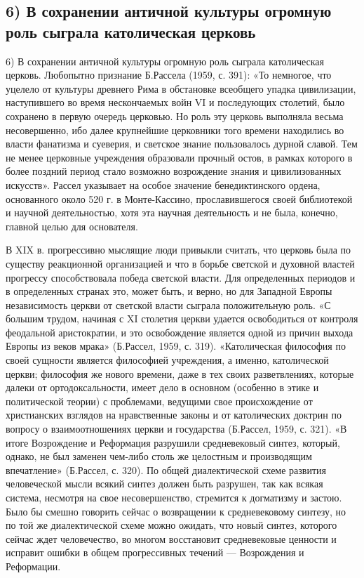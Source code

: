 \subsection{6) В сохранении античной культуры огромную роль сыграла
католическая церковь}

6) В сохранении античной культуры огромную роль сыграла
католическая церковь. Любопытно признание Б.Рассела (1959, с. 391):
«То немногое, что уцелело от культуры древнего Рима в обстановке
всеобщего упадка цивилизации, наступившего во время нескончаемых войн
VI и последующих столетий, было сохранено в первую очередь церковью.
Но роль эту церковь выполняла весьма несовершенно, ибо далее
крупнейшие церковники того времени находились во власти фанатизма и
суеверия, и светское знание пользовалось дурной славой. Тем не менее
церковные учреждения образовали прочный остов, в рамках которого в
более поздний период стало возможно возрождение знания и
цивилизованных искусств». Рассел указывает на особое значение
бенедиктинского ордена, основанного около 520 г. в Монте-Кассино,
прославившегося своей библиотекой и научной деятельностью, хотя эта
научная деятельность и не была, конечно, главной целью для основателя.

В XIX в. прогрессивно мыслящие люди привыкли считать, что церковь была
по существу реакционной организацией и что в борьбе светской и
духовной властей прогрессу способствовала победа светской власти. Для
определенных периодов и в определенных странах это, может быть, и
верно, но для Западной Европы независимость церкви от светской власти
сыграла положительную роль. «С большим трудом, начиная с XI столетия
церкви удается освободиться от контроля феодальной аристократии, и это
освобождение является одной из причин выхода Европы из веков мрака»
(Б.Рассел, 1959, с. 319). «Католическая философия по своей сущности
является философией учреждения, а именно, католической церкви;
философия же нового времени, даже в тех своих разветвлениях, которые
далеки от ортодоксальности, имеет дело в основном (особенно в этике и
политической теории) с проблемами, ведущими свое происхождение от
христианских взглядов на нравственные законы и от католических доктрин
по вопросу о взаимоотношениях церкви и государства (Б.Рассел, 1959, с.
321). «В итоге Возрождение и Реформация разрушили средневековый
синтез, который, однако, не был заменен чем-либо столь же целостным и
производящим впечатление» (Б.Рассел, с. 320). По общей диалектической
схеме развития человеческой мысли всякий синтез должен быть разрушен,
так как всякая система, несмотря на свое несовершенство, стремится к
догматизму и застою. Было бы смешно говорить сейчас о возвращении к
средневековому синтезу, но по той же диалектической схеме можно
ожидать, что новый синтез, которого сейчас ждет человечество, во
многом восстановит средневековые ценности и исправит ошибки в общем
прогрессивных течений --- Возрождения и Реформации.

